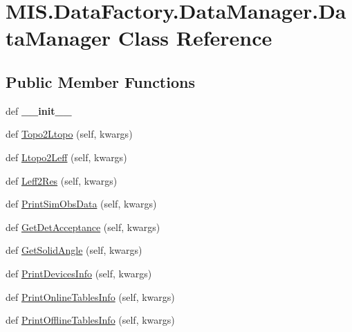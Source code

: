 \hypertarget{classMIS_1_1DataFactory_1_1DataManager_1_1DataManager}{}\section{M\+I\+S.\+Data\+Factory.\+Data\+Manager.\+Data\+Manager Class Reference}
\label{classMIS_1_1DataFactory_1_1DataManager_1_1DataManager}
\subsection*{Public Member Functions}
\begin{DoxyCompactItemize}
\item 
\mbox{\label{classMIS_1_1DataFactory_1_1DataManager_1_1DataManager_a6dadb970d76ecab33715bddfc4a1c455}} 
def {\bfseries \+\_\+\+\_\+init\+\_\+\+\_\+}
\item 
def \hyperlink{classMIS_1_1DataFactory_1_1DataManager_1_1DataManager_ac78b3f3d3324a3a561a980ca9039c633}{Topo2\+Ltopo} (self, kwargs)
\item 
def \hyperlink{classMIS_1_1DataFactory_1_1DataManager_1_1DataManager_a129bed75db0297273b38917b98e18e81}{Ltopo2\+Leff} (self, kwargs)
\item 
def \hyperlink{classMIS_1_1DataFactory_1_1DataManager_1_1DataManager_a397091f25ef3e96367373772825e33fe}{Leff2\+Res} (self, kwargs)
\item 
def \hyperlink{classMIS_1_1DataFactory_1_1DataManager_1_1DataManager_af3306f7c395fae4954bb68e343d834ec}{Print\+Sim\+Obs\+Data} (self, kwargs)
\item 
def \hyperlink{classMIS_1_1DataFactory_1_1DataManager_1_1DataManager_a2f47c4aab6fbed40b00fd4c3009b1f4c}{Get\+Det\+Acceptance} (self, kwargs)
\item 
def \hyperlink{classMIS_1_1DataFactory_1_1DataManager_1_1DataManager_aeda99998092f606a8850f5db96977cdc}{Get\+Solid\+Angle} (self, kwargs)
\item 
def \hyperlink{classMIS_1_1DataFactory_1_1DataManager_1_1DataManager_a484b0cdaf751469b058add8111a6c711}{Print\+Devices\+Info} (self, kwargs)
\item 
def \hyperlink{classMIS_1_1DataFactory_1_1DataManager_1_1DataManager_a1d38cd8a95a1473fe1042ceb895f5a65}{Print\+Online\+Tables\+Info} (self, kwargs)
\item 
def \hyperlink{classMIS_1_1DataFactory_1_1DataManager_1_1DataManager_a955e9b26198868bb25d3a37d9e6d7be6}{Print\+Offline\+Tables\+Info} (self, kwargs)

\end{DoxyCompactItemize}

